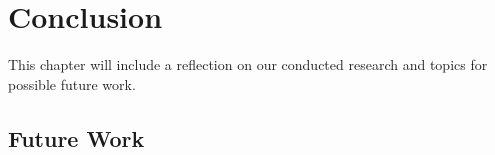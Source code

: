 \chapter{Conclusion}
\label{chapter:conclusion}

This chapter will include a reflection on our conducted research and topics for
possible future work.

\section{Future Work}

